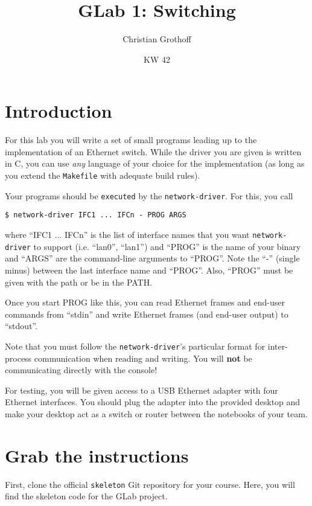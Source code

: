 \documentclass{article}
\title{GLab 1: Switching}
\author{Christian Grothoff}
\date{KW 42}
\begin{document}
\maketitle

\section{Introduction}

For this lab you will write a set of small programs leading up to the
implementation of an Ethernet switch.  While the driver you are given
is written in C, you can use {\em any} language of your choice for the
implementation (as long as you extend the {\tt Makefile} with adequate
build rules).

Your programs should be {\tt executed} by the {\tt network-driver}.
For this, you call
\begin{verbatim}
$ network-driver IFC1 ... IFCn - PROG ARGS
\end{verbatim}
where ``IFC1 ... IFCn'' is the list of interface names that you
want {\tt network-driver} to support (i.e. ``lan0'', ``lan1'')
and ``PROG'' is the name of your binary and ``ARGS'' are the
command-line arguments to ``PROG''.  Note the ``-'' (single minus)
between the last interface name and ``PROG''.  Also, ``PROG'' must
be given with the path or be in the PATH.

Once you start PROG like this, you can read Ethernet frames
and end-user commands from ``stdin'' and write Ethernet
frames (and end-user output) to ``stdout''.

Note that you must follow the {\tt network-driver}'s particular
format for inter-process communication when reading and writing.
You will {\bf not} be communicating directly with the console!

For testing, you will be given access to a USB Ethernet adapter with
four Ethernet interfaces.  You should plug the adapter into the
provided desktop and make your desktop act as a switch or router
between the notebooks of your team.


\section{Grab the instructions}

First, clone the official {\tt skeleton} Git repository for your
course.  Here, you will find the skeleton code for the GLab project.
\end{document}

